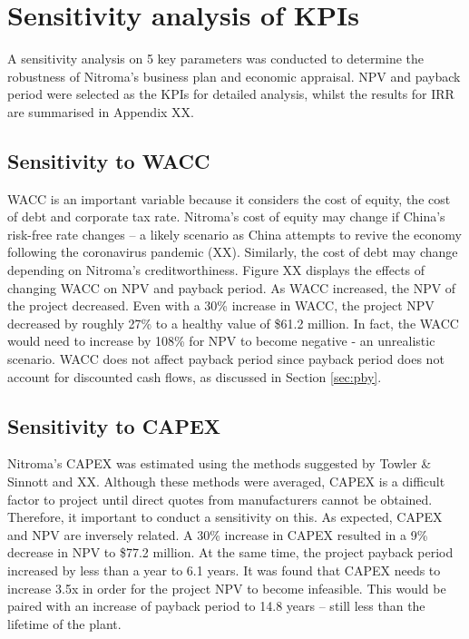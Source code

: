 \section{Sensitivity analysis of KPIs}
A sensitivity analysis on 5 key parameters was conducted to determine the robustness of Nitroma’s business plan and economic appraisal. NPV and payback period were selected as the KPIs for detailed analysis, whilst the results for IRR are summarised in Appendix XX. 

\subsection{Sensitivity to WACC}
WACC is an important variable because it considers the cost of equity, the cost of debt and corporate tax rate. Nitroma’s cost of equity may change if China’s risk-free rate changes – a likely scenario as China attempts to revive the economy following the coronavirus pandemic (XX). Similarly, the cost of debt may change depending on Nitroma’s creditworthiness.  Figure XX displays the effects of changing WACC on NPV and payback period. As WACC increased, the NPV of the project decreased. Even with a 30\% increase in WACC, the project NPV decreased by roughly 27\% to a healthy value of \$61.2 million. In fact, the WACC would need to increase by 108\% for NPV to become negative - an unrealistic scenario. WACC does not affect payback period since payback period does not account for discounted cash flows, as discussed in Section \ref{sec:pby}. 

\subsection{Sensitivity to CAPEX}
Nitroma’s CAPEX was estimated using the methods suggested by Towler \& Sinnott and XX. Although these methods were averaged, CAPEX is a difficult factor to project until direct quotes from manufacturers cannot be obtained. Therefore, it important to conduct a sensitivity on this. As expected, CAPEX and NPV are inversely related. A 30\% increase in CAPEX resulted in a 9\% decrease in NPV to \$77.2 million. At the same time, the project payback period increased by less than a year to 6.1 years. It was found that CAPEX needs to increase 3.5x in order for the project NPV to become infeasible. This would be paired with an increase of payback period to 14.8 years – still less than the lifetime of the plant.

